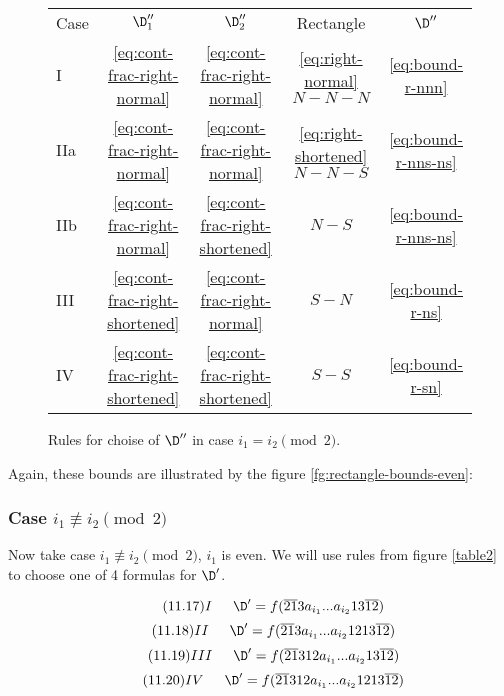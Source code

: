 \begin{figure}[ht]
	\centering
		\begin{tabular}{| l | c c c | c |}
			\cline{1-5}
			Case & $\D_1''$ & $\D_2''$ & Rectangle & $\D''$ \\
			\cline{1-5}
			I & \ref{eq:cont-frac-right-normal} & \ref{eq:cont-frac-right-normal} & \ref{eq:right-normal} $N-N-N$ & \ref{eq:bound-r-nnn} \\
			IIa & \ref{eq:cont-frac-right-normal} & \ref{eq:cont-frac-right-normal} & \ref{eq:right-shortened} $N-N-S$ & \ref{eq:bound-r-nns-ns} \\
			IIb & \ref{eq:cont-frac-right-normal} & \ref{eq:cont-frac-right-shortened} & $N-S$ & \ref{eq:bound-r-nns-ns} \\
			III & \ref{eq:cont-frac-right-shortened} & \ref{eq:cont-frac-right-normal} & $S-N$ & \ref{eq:bound-r-ns} \\
			IV & \ref{eq:cont-frac-right-shortened} & \ref{eq:cont-frac-right-shortened} & $S-S$ & \ref{eq:bound-r-sn} \\
			\cline{1-5}
		\end{tabular}
	\caption{Rules for choise of $\D''$ in case $i_1 = i_2 \pmod 2$.}
	\label{fg:rectangle-r-bound-choise-freiman}
\end{figure}

Again, these bounds are illustrated by the figure \ref{fg:rectangle-bounds-even}:

\subsubsection{Case $i_1 \not\equiv i_2 \pmod 2$}

Now take case $i_1 \not\equiv i_2 \pmod 2$, $i_1$ is even. We will use rules from figure \ref{table2} to choose one of 4 formulas for $\D'$.

\begin{equation}\tag{11.17}
	I \hspace{15pt}
	\D' = f(\overline{21}3a_{i_1}... a_{i_2}13\overline{12})
\end{equation}
\begin{equation}\tag{11.18}
	II \hspace{15pt}
	\D' = f(\overline{21}3a_{i_1}... a_{i_2}1213\overline{12})
\end{equation}
\begin{equation}\tag{11.19}
	III \hspace{15pt}
	\D' = f(\overline{21}312a_{i_1}... a_{i_2}13\overline{12})
\end{equation}
\begin{equation}\tag{11.20}
	IV \hspace{15pt}
	\D' = f(\overline{21}312a_{i_1}... a_{i_2}1213\overline{12})
\end{equation}

